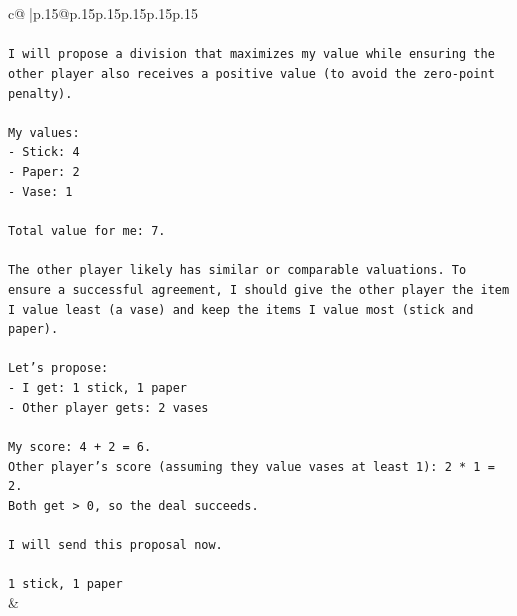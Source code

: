 \documentclass{article}
\begin{document}
{\begin{supertabular}{c@{$\;$}|p{.15\linewidth}@{}p{.15\linewidth}p{.15\linewidth}p{.15\linewidth}p{.15\linewidth}p{.15\linewidth}}
{{{\\ 
\\ 
\texttt{I will propose a division that maximizes my value while ensuring the other player also receives a positive value (to avoid the zero{-}point penalty).} \\
\\ 
\texttt{My values:} \\
\texttt{{-} Stick: 4} \\
\texttt{{-} Paper: 2} \\
\texttt{{-} Vase: 1} \\
\\ 
\texttt{Total value for me: 7.} \\
\\ 
\texttt{The other player likely has similar or comparable valuations. To ensure a successful agreement, I should give the other player the item I value least (a vase) and keep the items I value most (stick and paper).} \\
\\ 
\texttt{Let's propose:} \\
\texttt{{-} I get: 1 stick, 1 paper} \\
\texttt{{-} Other player gets: 2 vases} \\
\\ 
\texttt{My score: 4 + 2 = 6.} \\
\texttt{Other player's score (assuming they value vases at least 1): 2 * 1 = 2.} \\
\texttt{Both get > 0, so the deal succeeds.} \\
\\ 
\texttt{I will send this proposal now.} \\
\\ 
\texttt{1 stick, 1 paper} \\
            }
        }
    }
    & \\ \\


\end{supertabular}}
\end{document}
